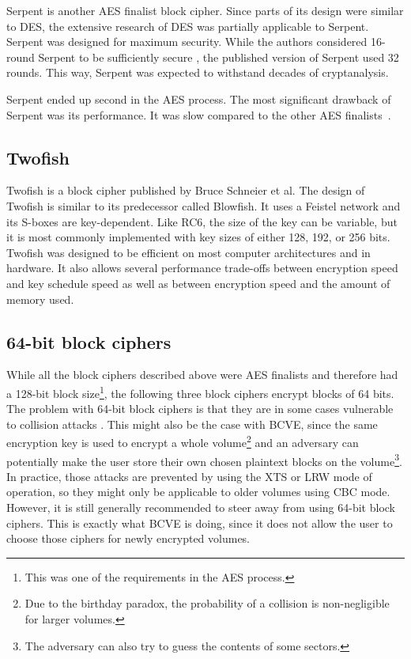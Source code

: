 \documentclass[thesis=B,english]{FITthesis}[2012/10/20]
\begin{document}
	Serpent \cite{serpent} is another AES finalist block cipher. Since parts of its design were similar to DES, the extensive research of DES was partially applicable to Serpent. Serpent was designed for maximum security. While the authors considered 16-round Serpent to be sufficiently secure \cite{serpent}, the published version of Serpent used 32 rounds. This way, Serpent was expected to withstand decades of cryptanalysis. 
	
	Serpent ended up second in the AES process. The most significant drawback of Serpent was its performance. It was slow compared to the other AES finalists~\cite{aes_perf}.
	
	\subsection{Twofish}
	
	Twofish \cite{twofish} is a block cipher published by Bruce Schneier et al. The design of Twofish is similar to its predecessor called Blowfish. It uses a Feistel network and its S-boxes are key-dependent. Like RC6, the size of the key can be variable, but it is most commonly implemented with key sizes of either 128, 192, or 256 bits. Twofish was designed to be efficient on most computer architectures and in hardware. It also allows several performance trade-offs between encryption speed and key schedule speed as well as between encryption speed and the amount of memory used.
	
	\subsection{64-bit block ciphers}
	
	While all the block ciphers described above were AES finalists and therefore had a 128-bit block size\footnote{This was one of the requirements in the AES process.}, the following three block ciphers encrypt blocks of 64 bits. The problem with 64-bit block ciphers is that they are in some cases vulnerable to collision attacks \cite{sweet32}. This might also be the case with BCVE, since the same encryption key is used to encrypt a whole volume\footnote{Due to the birthday paradox, the probability of a collision is non-negligible for larger volumes.} and an adversary can potentially make the user store their own chosen plaintext blocks on the volume\footnote{The adversary can also try to guess the contents of some sectors.}. In practice, those attacks are prevented by using the XTS or LRW mode of operation, so they might only be applicable to older volumes using CBC mode. However, it is still generally recommended to steer away from using 64-bit block ciphers. This is exactly what BCVE is doing, since it does not allow the user to choose those ciphers for newly encrypted volumes.
	
\end{document}

